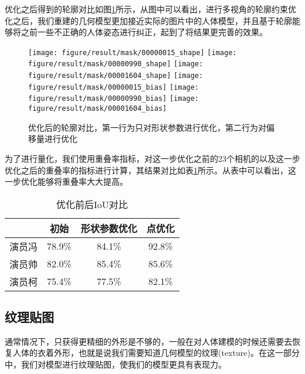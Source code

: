 优化之后得到的轮廓对比如图\ref{fig:maskout}所示，从图中可以看出，进行多视角的轮廓约束优化之后，我们重建的几何模型更加接近实际的图片中的人体模型，并且基于轮廓能够将之前一些不正确的人体姿态进行纠正，起到了将结果更完善的效果。
\begin{figure}[htbp]
    \centering
    \texttt{[image: figure/result/mask/00000015\_shape]} \hfill
    \texttt{[image: figure/result/mask/00000990\_shape]} \hfill
    \texttt{[image: figure/result/mask/00001604\_shape]}
    \texttt{[image: figure/result/mask/00000015\_bias]} \hfill
    \texttt{[image: figure/result/mask/00000990\_bias]} \hfill
    \texttt{[image: figure/result/mask/00001604\_bias]}
    \caption{\label{fig:maskout} 优化后的轮廓对比，第一行为只对形状参数进行优化，第二行为对偏移量进行优化}
\end{figure}
为了进行量化，我们使用重叠率指标，对这一步优化之前的23个相机的以及这一步优化之后的重叠率的指标进行计算，其结果对比如表\ref{tab:mask}所示。从表中可以看出，这一步优化能够将重叠率大大提高。
\begin{table}[htbp]
    \centering
    \begin{tabular}{lccc}
        \hline
              & 初始 & 形状参数优化 & 点优化  \\
        \hline
        演员冯 & 78.9\% &  84.1\% & 92.8\%  \\
        演员帅 & 82.0\% & 85.4\% & 85.6\%   \\
        演员柯 & 75.4\% & 77.5\% & 82.1\%  \\
        \hline
    \end{tabular}
    \caption{优化前后IoU对比\label{tab:mask}}
\end{table}

\subsection{纹理贴图}
通常情况下，只获得更精细的外形是不够的，一般在对人体建模的时候还需要去恢复人体的衣着外形，也就是说我们需要知道几何模型的纹理(texture)。在这一部分中，我们对模型进行纹理贴图，使我们的模型更具有表现力。

